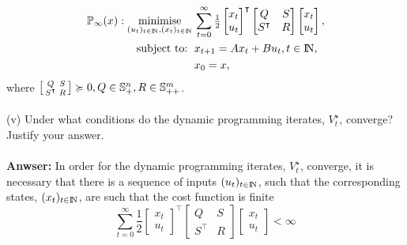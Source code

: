 \documentclass[a4paper,11pt,reqno]{amsart}
\newcommand{\N}{{\rm I\!N}}
\newcommand{\tran}{\intercal}
\DeclareMathOperator*{\minimise}{minimise}
\begin{document}
\begin{subequations}
    \begin{align}
        \mathbb{P}_{\infty}(x): \minimise_{(u_t)_{t\in \N},(x_t)_{t\in \N}} \,
        & \sum_{t=0}^{\infty}\textstyle\frac{1}{2}
        \begin{bmatrix}
            x_t\\
            u_t
        \end{bmatrix}^{\tran}
        \begin{bmatrix}
            Q&S\\
            S^{\tran}&R
        \end{bmatrix}
        \begin{bmatrix}
            x_t\\
            u_t
        \end{bmatrix},
        \\
        \text{subject to: }\,
        & x_{t+1} = A x_t + B u_t, t\in\N,
        \\
        & x_{0} = x,
    \end{align}
\end{subequations}
where $\begin{bsmallmatrix}Q&S\\S^{\tran}&R\end{bsmallmatrix}\succcurlyeq 0, Q\in \mathbb{S}^n_+, R\in \mathbb{S}^m_{++}$.
\\ \\
(v) Under what conditions do the dynamic programming iterates, $V^{\star}_t$, converge? Justify your answer.
\\ \\
\textbf{Anwser:} In order for the dynamic programming iterates, $V^{\star}_t$, converge, it is necessary that there is a sequence of inputs $(u_t)_{t\in \N}$, such that the corresponding states, $(x_t)_{t\in \N}$, are such that the cost function is finite
\begin{equation}
    \sum_{t=0}^{\infty}\textstyle\frac{1}{2}
        \begin{bmatrix}
            x_t\\
            u_t
        \end{bmatrix}^{\tran}
        \begin{bmatrix}
            Q&S\\
            S^{\tran}&R
        \end{bmatrix}
        \begin{bmatrix}
            x_t\\
            u_t
        \end{bmatrix}
    <\infty
\end{equation}
\end{document}
